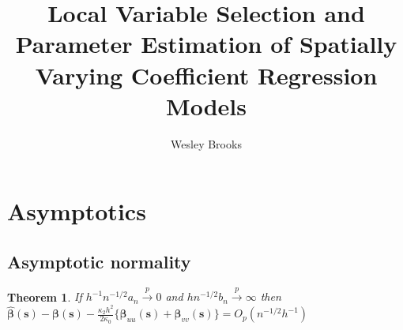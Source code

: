 \documentclass[authoryear, review, 11pt]{elsarticle}
\title{Local Variable Selection and Parameter Estimation of Spatially Varying Coefficient Regression Models}
\author{Wesley Brooks}
\date{}                                           %
\newtheorem{theorem}{Theorem}[section]
\begin{document}

    \maketitle

    \section{Asymptotics}
    \subsection{Asymptotic normality}
    \begin{theorem}\label{theorem:consistency}     
        If $h^{-1} n^{-1/2} a_n \xrightarrow{p} 0$ and $h n^{-1/2} b_n \xrightarrow{p} \infty$ then $\hat{\bm{\beta}}(\bm{s}) - \bm{\beta}(\bm{s}) - \frac{\kappa_2 h^2}{2 \kappa_0} \{ \bm{\beta}_{uu}(\bm{s}) + \bm{\beta}_{vv}(\bm{s}) \} = O_p(n^{-1/2} h^{-1} )$
    \end{theorem}
  
\end{document}
